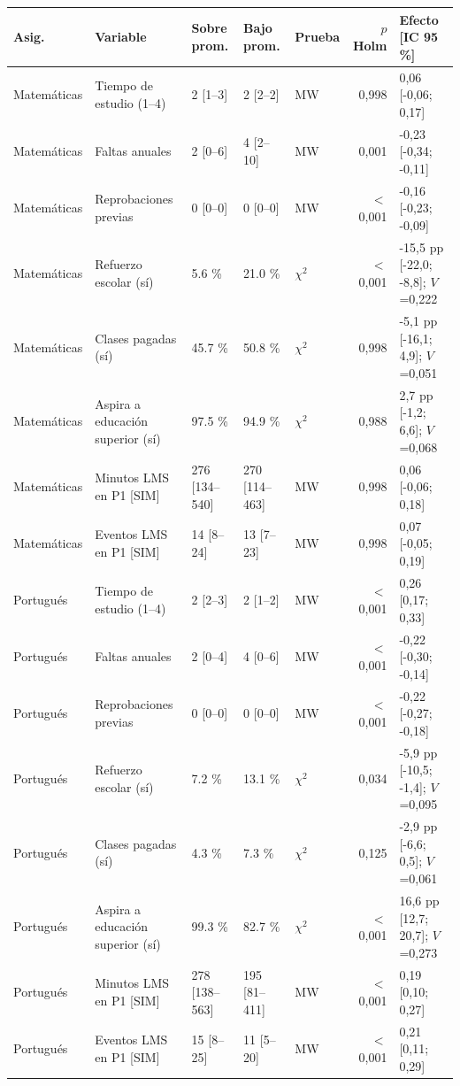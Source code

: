 \begin{tabular}{lllllrl}
\toprule
Asig. & Variable & Sobre prom. & Bajo prom. & Prueba & $p$ Holm & Efecto [IC 95\,\%] \\
\midrule
Matemáticas & Tiempo de estudio (1–4) & 2 [1–3] & 2 [2–2] & MW & 0,998 & 0,06 [-0,06; 0,17] \\
Matemáticas & Faltas anuales & 2 [0–6] & 4 [2–10] & MW & 0,001 & -0,23 [-0,34; -0,11] \\
Matemáticas & Reprobaciones previas & 0 [0–0] & 0 [0–0] & MW & $<$0,001 & -0,16 [-0,23; -0,09] \\
Matemáticas & Refuerzo escolar (sí) & 5.6 \% & 21.0 \% & $\chi^2$ & $<$0,001 & -15,5 pp [-22,0; -8,8]; $V$=0,222 \\
Matemáticas & Clases pagadas (sí) & 45.7 \% & 50.8 \% & $\chi^2$ & 0,998 & -5,1 pp [-16,1; 4,9]; $V$=0,051 \\
Matemáticas & Aspira a educación superior (sí) & 97.5 \% & 94.9 \% & $\chi^2$ & 0,988 & 2,7 pp [-1,2; 6,6]; $V$=0,068 \\
Matemáticas & Minutos LMS en P1 [SIM] & 276 [134–540] & 270 [114–463] & MW & 0,998 & 0,06 [-0,06; 0,18] \\
Matemáticas & Eventos LMS en P1 [SIM] & 14 [8–24] & 13 [7–23] & MW & 0,998 & 0,07 [-0,05; 0,19] \\
Portugués & Tiempo de estudio (1–4) & 2 [2–3] & 2 [1–2] & MW & $<$0,001 & 0,26 [0,17; 0,33] \\
Portugués & Faltas anuales & 2 [0–4] & 4 [0–6] & MW & $<$0,001 & -0,22 [-0,30; -0,14] \\
Portugués & Reprobaciones previas & 0 [0–0] & 0 [0–0] & MW & $<$0,001 & -0,22 [-0,27; -0,18] \\
Portugués & Refuerzo escolar (sí) & 7.2 \% & 13.1 \% & $\chi^2$ & 0,034 & -5,9 pp [-10,5; -1,4]; $V$=0,095 \\
Portugués & Clases pagadas (sí) & 4.3 \% & 7.3 \% & $\chi^2$ & 0,125 & -2,9 pp [-6,6; 0,5]; $V$=0,061 \\
Portugués & Aspira a educación superior (sí) & 99.3 \% & 82.7 \% & $\chi^2$ & $<$0,001 & 16,6 pp [12,7; 20,7]; $V$=0,273 \\
Portugués & Minutos LMS en P1 [SIM] & 278 [138–563] & 195 [81–411] & MW & $<$0,001 & 0,19 [0,10; 0,27] \\
Portugués & Eventos LMS en P1 [SIM] & 15 [8–25] & 11 [5–20] & MW & $<$0,001 & 0,21 [0,11; 0,29] \\
\bottomrule
\end{tabular}
